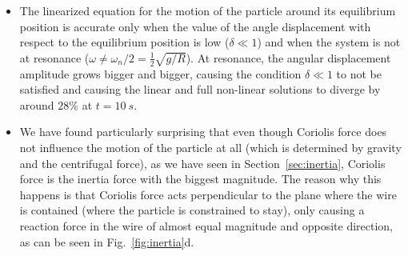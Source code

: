 \documentclass[11pt,a4paper]{article}
\numberwithin{equation}{section}
\begin{document}
\begin{itemize}[noitemsep,topsep=2pt]
\item The linearized equation for the motion of the particle around its equilibrium position is accurate only when the value of the angle displacement with respect to the equilibrium position is low ($\delta \ll 1$) and when the system is not at resonance ($\omega \ne \omega_n/2 = \tfrac{1}{2}\sqrt{g/R}$). At resonance, the angular displacement amplitude grows bigger and bigger, causing the condition $\delta \ll 1$ to not be satisfied and causing the linear and full non-linear solutions to diverge by around $28\%$ at $t = \SI{10}{s}$.

\item We have found particularly surprising that even though Coriolis force does not influence the motion of the particle at all (which is determined by gravity and the centrifugal force), as we have seen in Section~\ref{sec:inertia}, Coriolis force is the inertia force with the biggest magnitude. The reason why this happens is that Coriolis force acts perpendicular to the plane where the wire is contained (where the particle is constrained to stay), only causing a reaction force in the wire of almost equal magnitude and opposite direction, as can be seen in Fig.~\ref{fig:inertia}d.

\end{itemize}

{\footnotesize
\nocite{*}

}
\end{document}
